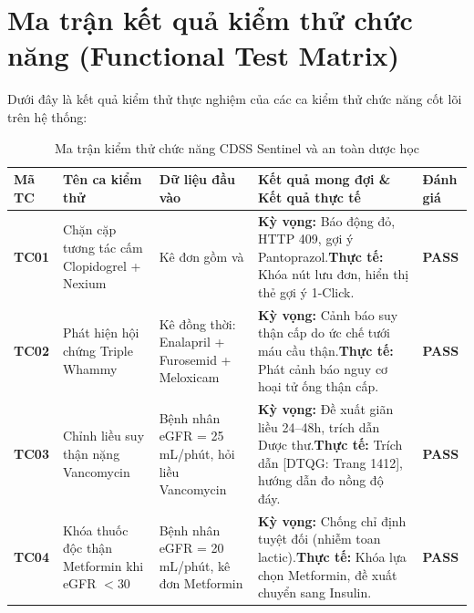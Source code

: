 \section{Ma trận kết quả kiểm thử chức năng (Functional Test Matrix)}
\label{sec:functional_test_matrix}

Dưới đây là kết quả kiểm thử thực nghiệm của các ca kiểm thử chức năng cốt lõi trên hệ thống:

\begin{table}[htbp]
\centering
\small
\begin{tabularx}{\textwidth}{C{1.2cm} L{3.5cm} L{3.5cm} Y C{1.5cm}}
\toprule
\textbf{Mã TC} & \textbf{Tên ca kiểm thử} & \textbf{Dữ liệu đầu vào} & \textbf{Kết quả mong đợi \& Kết quả thực tế} & \textbf{Đánh giá} \\
\midrule
\textbf{TC01} & Chặn cặp tương tác cấm Clopidogrel + Nexium & Kê đơn gồm  và  & \textbf{Kỳ vọng:} Báo động đỏ, HTTP 409, gợi ý Pantoprazol.\newline \textbf{Thực tế:} Khóa nút lưu đơn, hiển thị thẻ gợi ý 1-Click. & \textbf{PASS} \\
\addlinespace
\textbf{TC02} & Phát hiện hội chứng Triple Whammy & Kê đồng thời: Enalapril + Furosemid + Meloxicam & \textbf{Kỳ vọng:} Cảnh báo suy thận cấp do ức chế tưới máu cầu thận.\newline \textbf{Thực tế:} Phát cảnh báo nguy cơ hoại tử ống thận cấp. & \textbf{PASS} \\
\addlinespace
\textbf{TC03} & Chỉnh liều suy thận nặng Vancomycin & Bệnh nhân eGFR = 25 mL/phút, hỏi liều Vancomycin & \textbf{Kỳ vọng:} Đề xuất giãn liều 24--48h, trích dẫn Dược thư.\newline \textbf{Thực tế:} Trích dẫn [DTQG: Trang 1412], hướng dẫn đo nồng độ đáy. & \textbf{PASS} \\
\addlinespace
\textbf{TC04} & Khóa thuốc độc thận Metformin khi eGFR $< 30$ & Bệnh nhân eGFR = 20 mL/phút, kê đơn Metformin & \textbf{Kỳ vọng:} Chống chỉ định tuyệt đối (nhiễm toan lactic).\newline \textbf{Thực tế:} Khóa lựa chọn Metformin, đề xuất chuyển sang Insulin. & \textbf{PASS} \\
\bottomrule
\end{tabularx}
\caption{Ma trận kiểm thử chức năng CDSS Sentinel và an toàn dược học}
\end{table}

